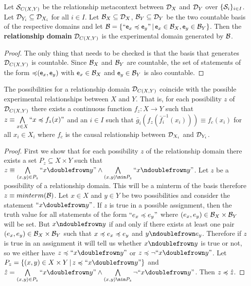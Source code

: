 \documentclass[11pt,letterpaper,fleqn]{memoir} %
\begin{document}
\begin{mathSection}
	\begin{defn}
		Let $\logCtx_{C(X,Y)}$ be the relationship metacontext between $\edomain_X$ and $\edomain_Y$ over $\{ \logCtx_i \}_{i \in I}$. Let $\edomain_{Y_i} \subseteq \edomain_{X_i}$ for all $i \in I$. Let $\basis_X \subseteq \edomain_X$,  $\basis_Y \subseteq \edomain_Y$ be the two countable basis of the respective domains and let $\basis = \{ ``\stmt[e]_x \narrower \stmt[e]_y" \, | \,  \stmt[e]_x \in \basis_X, \stmt[e]_y \in \basis_Y\}$. Then the \textbf{relationship domain} $\edomain_{C(X,Y)}$ is the experimental domain generated by $\basis$.
	\end{defn}
	\begin{proof}
		The only thing that needs to be checked is that the basis that generates $\edomain_{C(X,Y)}$ is countable. Since $\basis_X$ and $\basis_Y$ are countable, the set of statements of the form $\mathbin{\narrower}(\stmt[e]_x, \stmt[e]_y)$ with $\stmt[e]_x \in \basis_X$ and $ \stmt[e]_y \in \basis_Y$ is also countable.
	\end{proof}
\begin{prop}
	The possibilities for a relationship domain $\edomain_{C(X,Y)}$ coincide with the possible experimental relationships between $X$ and $Y$. That is, for each possibility $z$ of $\edomain_{C(X,Y)}$ there exists a continuous function $f_z : X \to Y$ such that $z\equiv\bigAND\limits_{x\in X} ``x \narrower f_z(x)"$ and an $i \in I$ such that $\bar{g}_i(f_z(\bar{f}_i^{-1}(x_i))) \equiv f_c (x_i)$ for all $x_i \in X_i$ where $f_c$ is the causal relationship between $\edomain_{X_i}$ and $\edomain_{Y_i}$.
\end{prop}
\begin{proof}
	First we show that for each possibility $z$ of the relationship domain there exists a set $P_z \subseteq X \times Y$ such that $z \equiv \bigAND\limits_{(x,y) \in P_z} ``x \comp y"  \AND \bigAND\limits_{(x,y) \nin P_z} ``x \ncomp y"$. Let $z$ be a possibility of a relationship domain. This will be a minterm of the basis therefore $z \equiv minterm(\basis)$. Let $x \in X$ and $y \in Y$ be two possibilities and consider the statement $``x \comp y"$. If $z$ is true in a possible assignment, then the truth value for all statements of the form $``e_x \narrower e_y"$ where $(e_x, e_y) \in \basis_X \times \basis_Y$ will be set. But $x \ncomp y$ if and only if there exists at least one pair $(e_x, e_y) \in \basis_X \times \basis_Y$ such that $x \narrower e_x \narrower e_y$ and $y \ncomp e_y$. Therefore if $z$ is true in an assignment it will tell us whether $x \ncomp y$ is true or not, so we either have $z \narrower ``x \comp y"$ or $z \narrower \NOT ``x \comp y"$. Let $P_z = \{ (x,y) \in X \times Y \, | \, z \narrower ``x \comp y" \}$ and $\hat{z} = \bigAND\limits_{(x,y) \in P_z} ``x \comp y" \AND  \bigAND\limits_{(x,y) \nin P_z} \NOT ``x \comp y" $. Then $z \narrower \hat{z}$.
	

\end{proof}
\end{mathSection}
\end{document}
